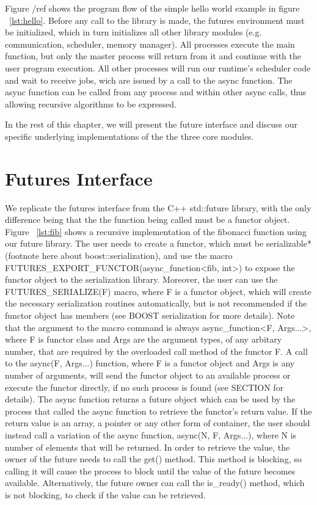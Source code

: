 Figure /ref shows the program flow of the simple
hello world example in figure ~\ref{lst:hello}.  Before any call to the library is made, the futures
environment must be initialized, which in turn initializes all other library modules 
(e.g. communication, scheduler, memory manager).
All processes execute the main function, but only
the master process will return from it and continue with the user program execution.
All other processes will run our runtime's scheduler code and wait to receive jobs, wich
are issued by a call to the async function.  The async function can be called from any process 
and within other async calls, thus allowing recursive algorithms to be expressed.     


In the rest of this chapter, we will present the future interface and discuss our specific underlying
implementations of the the three core modules.

\section{Futures Interface}
\label{sect:futures-interface}
We replicate the futures interface from the C++ std::future library, with the only difference being that 
the the function being called must be a functor object.  Figure ~\ref{lst:fib} shows a recursive implementation
of the fibonacci function using our future library.  The user needs to create a functor, which must be
serializable*(footnote here about boost::serialization), and use the macro 
FUTURES\_EXPORT\_FUNCTOR(async\_function<fib, int>) to expose the functor object to the serialization library.
Moreover, the user can use the FUTURES\_SERIALIZE(F) macro, where F is a functor object, 
which will create the necessary serialization routines automatically, but is not recommended if the 
functor object has members (see BOOST serialization for more details).
Note that the argument to the macro command is always async\_function<F, Args...>, where F is functor class
and Args are the argument types, of any arbitary number, that are required by the overloaded call method 
of the functor F.  A call to the async(F, Args...) function, where F is a functor object and Args is any number of 
arguments,
will send the functor object to an available process or execute 
the functor directly, if no such process is found (see SECTION for details). The async function returns a 
future object which can be used by the process that called the async function to retrieve the 
functor's return value.  If the return value is an array, a pointer or any other form of container, the user
should instead call a variation of the async function, async(N, F, Args...), where N is number of elements
that will be returned. In order to retrieve the value,
the owner of the future needs to call the get() method.  This method is blocking, so calling it will cause the 
process to block until the value of the future becomes available.  Alternatively, the future owner can call the
is\_ready() method, which is not blocking, to check if the value can be retrieved. 

